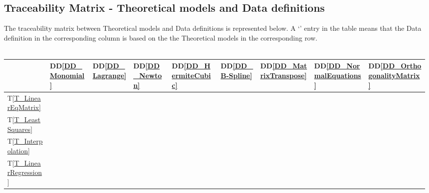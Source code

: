 \documentclass[12pt]{article}
\newcommand{\ddref}[1]{DD\ref{#1}}
\newcommand{\tref}[1]{T\ref{#1}}
\begin{document}
\subsection{Traceability Matrix - Theoretical models and Data definitions}
The traceability matrix between Theoretical models and Data definitions is represented below. A `\checkmark' entry in the table means that the Data definition in the corresponding column is based on the the Theoretical models in the corresponding row.\\
~\newline
\begin{tabular}{|p{1.3cm}|p{1cm}|p{1cm}|p{1cm}|p{1cm}|p{1cm}|p{1cm}|p{1cm}|p{1cm}|}
	
	\hline
	& \ddref{DD_Monomial} & \ddref{DD_Lagrange} & \ddref{DD_Newton} & \ddref{DD_HermiteCubic} & \ddref{DD_B-Spline} & \ddref{DD_MatrixTranspose}  & \ddref{DD_NormalEquations} & \ddref{DD_OrthogonalityMatrix}\\
	\hline
	\tref{T_LinearEqMatrix} & \checkmark & \checkmark  & \checkmark  & \checkmark  &   & \checkmark   & \checkmark & \checkmark\\
	\hline
	\tref{T_LeastSquares} &  &   &   &   &   & \checkmark   & \checkmark & \checkmark \\
	\hline
	\tref{T_Interpolation} & \checkmark & \checkmark  & \checkmark  & \checkmark  & \checkmark  &    &  &  \\
	\hline
	\tref{T_LinearRegression} &  &   &   &   &   & \checkmark   & \checkmark & \checkmark \\
	\hline
\end{tabular}\\
\end{document}
